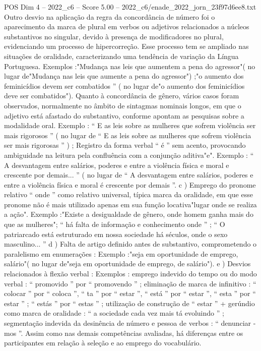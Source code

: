 \begin{textsample}{POS Dim 4 – 2022\_c6 – Score 5.00 – 2022\_c6/enade\_2022\_jorn\_23f97d6ee8.txt}
Outro desvio na aplicação da regra da concordância de número foi o aparecimento da marca de plural em verbos ou adjetivos relacionados a núcleos substantivos no singular, devido à presença de modificadores no plural, evidenciando um processo de hipercorreção.
Esse processo tem se ampliado nas situações de oralidade, caracterizando uma tendência de variação da Língua Portuguesa.
Exemplos :"Mudança nas leis que aumentem a pena do agressor"( no lugar de"Mudança nas leis que aumente a pena do agressor") ;"o aumento dos feminicídios devem ser combatidos ” ( no lugar de"o aumento dos feminicídios deve ser combatidos").
Quanto à concordância de gênero, vários casos foram observados, normalmente no âmbito de sintagmas nominais longos, em que o adjetivo está afastado do substantivo, conforme apontam as pesquisas sobre a modalidade oral.
Exemplo : “ E as leis sobre as mulheres que sofrem violência ser mais rigorosos ” ( no lugar de “ E as leis sobre as mulheres que sofrem violência ser mais rigorosas ” ) ; Registro da forma verbal “ é ” sem acento, provocando ambiguidade na leitura pela confluência com a conjunção aditiva"e".
Exemplo : “ A desvantagem entre salários, poderes e entre a violência física e moral e crescente por demais... ” ( no lugar de “ A desvantagem entre salários, poderes e entre a violência física e moral é crescente por demais ”. c ) Emprego do pronome relativo “ onde ” como relativo universal, típica marca da oralidade, em que esse pronome não é mais utilizado apenas em sua função locativa"lugar onde se realiza a ação".
Exemplo :"Existe a desigualdade de gênero, onde homem ganha mais do que as mulheres"; “ há falta de informação e conhecimento onde ” ; “ O patriarcado está estruturado em nossa sociedade há séculos, onde o sexo masculino... ” d ) Falta de artigo definido antes de substantivo, comprometendo o paralelismo em enumerações : Exemplo :"seja em oportunidade de emprego, salário"( no lugar de"seja em oportunidade de emprego, de salário"). e ) Desvios relacionados à flexão verbal : Exemplos : emprego indevido do tempo ou do modo verbal : “ promovido ” por “ promovendo ” ; eliminação de marca de infinitivo : “ colocar ” por “ coloca ”, “ ta ” por “ estar ”, “ está ” por “ estar ”, “ esta ” por “ estar ” ; “ estás ” por “ estas ” ; utilização de construção de “ estar ” + gerúndio como marca de oralidade : “ a sociedade cada vez mais tá evoluindo ” ; segmentação indevida da desinência de número e pessoa de verbos : “ denunciar -mos ”.
Assim como nas demais competências avaliadas, há diferenças entre os participantes em relação à seleção e ao emprego do vocabulário.

\end{textsample}
